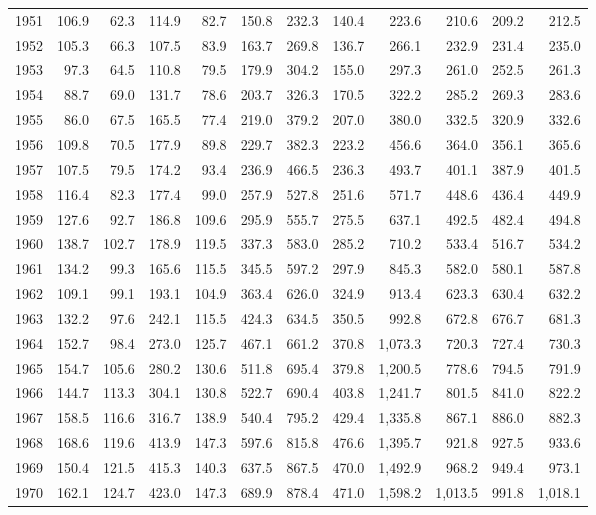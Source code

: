 \begin{longtable}{rrrrrrrrrrrr}
1951 & 106.9 & 62.3 & 114.9 & 82.7 & 150.8 & 232.3 & 140.4 & 223.6 & 210.6 & 209.2 & 212.5 \\
1952 & 105.3 & 66.3 & 107.5 & 83.9 & 163.7 & 269.8 & 136.7 & 266.1 & 232.9 & 231.4 & 235.0 \\
1953 & 97.3 & 64.5 & 110.8 & 79.5 & 179.9 & 304.2 & 155.0 & 297.3 & 261.0 & 252.5 & 261.3 \\
1954 & 88.7 & 69.0 & 131.7 & 78.6 & 203.7 & 326.3 & 170.5 & 322.2 & 285.2 & 269.3 & 283.6 \\
1955 & 86.0 & 67.5 & 165.5 & 77.4 & 219.0 & 379.2 & 207.0 & 380.0 & 332.5 & 320.9 & 332.6 \\
1956 & 109.8 & 70.5 & 177.9 & 89.8 & 229.7 & 382.3 & 223.2 & 456.6 & 364.0 & 356.1 & 365.6 \\
1957 & 107.5 & 79.5 & 174.2 & 93.4 & 236.9 & 466.5 & 236.3 & 493.7 & 401.1 & 387.9 & 401.5 \\
1958 & 116.4 & 82.3 & 177.4 & 99.0 & 257.9 & 527.8 & 251.6 & 571.7 & 448.6 & 436.4 & 449.9 \\
1959 & 127.6 & 92.7 & 186.8 & 109.6 & 295.9 & 555.7 & 275.5 & 637.1 & 492.5 & 482.4 & 494.8 \\
1960 & 138.7 & 102.7 & 178.9 & 119.5 & 337.3 & 583.0 & 285.2 & 710.2 & 533.4 & 516.7 & 534.2 \\
1961 & 134.2 & 99.3 & 165.6 & 115.5 & 345.5 & 597.2 & 297.9 & 845.3 & 582.0 & 580.1 & 587.8 \\
1962 & 109.1 & 99.1 & 193.1 & 104.9 & 363.4 & 626.0 & 324.9 & 913.4 & 623.3 & 630.4 & 632.2 \\
1963 & 132.2 & 97.6 & 242.1 & 115.5 & 424.3 & 634.5 & 350.5 & 992.8 & 672.8 & 676.7 & 681.3 \\
1964 & 152.7 & 98.4 & 273.0 & 125.7 & 467.1 & 661.2 & 370.8 & 1,073.3 & 720.3 & 727.4 & 730.3 \\
1965 & 154.7 & 105.6 & 280.2 & 130.6 & 511.8 & 695.4 & 379.8 & 1,200.5 & 778.6 & 794.5 & 791.9 \\
1966 & 144.7 & 113.3 & 304.1 & 130.8 & 522.7 & 690.4 & 403.8 & 1,241.7 & 801.5 & 841.0 & 822.2 \\
1967 & 158.5 & 116.6 & 316.7 & 138.9 & 540.4 & 795.2 & 429.4 & 1,335.8 & 867.1 & 886.0 & 882.3 \\
1968 & 168.6 & 119.6 & 413.9 & 147.3 & 597.6 & 815.8 & 476.6 & 1,395.7 & 921.8 & 927.5 & 933.6 \\
1969 & 150.4 & 121.5 & 415.3 & 140.3 & 637.5 & 867.5 & 470.0 & 1,492.9 & 968.2 & 949.4 & 973.1 \\
1970 & 162.1 & 124.7 & 423.0 & 147.3 & 689.9 & 878.4 & 471.0 & 1,598.2 & 1,013.5 & 991.8 & 1,018.1 \\

\end{longtable}
